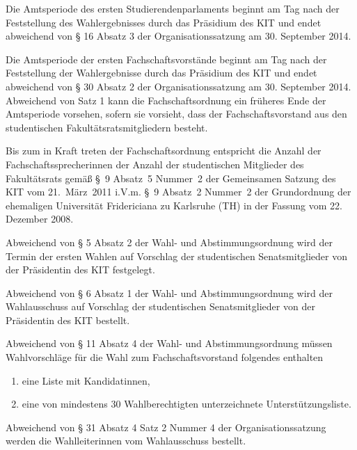 \begin{contract}
\setcounter{Paragraph}{0}
\setcounter{juratoclevel}{0}


\label{amtsperiode}

Die Amtsperiode des ersten Studierendenparlaments beginnt am Tag nach der Feststellung des Wahlergebnisses durch das Präsidium des KIT und endet abweichend von § 16 Absatz 3 der Organisationssatzung am 30. September 2014.

Die Amtsperiode der ersten Fachschaftsvorstände beginnt am Tag nach der Feststellung der Wahlergebnisse durch das Präsidium des KIT und endet abweichend von § 30 Absatz 2 der Organisationssatzung am 30. September 2014. Abweichend von Satz 1 kann die Fachschaftsordnung ein früheres Ende der Amtsperiode vorsehen, sofern sie vorsieht, dass der Fachschaftsvorstand aus den studentischen Fakultätsratsmitgliedern besteht.


\label{fachschaftssprecher}

Bis zum in Kraft treten der Fachschaftsordnung entspricht die Anzahl der Fachschaftssprecherinnen der Anzahl der studentischen Mitglieder des Fakultätsrats gemäß §~9 Absatz~5 Nummer~2 der Gemeinsamen Satzung des KIT vom 21.~März~2011 i.V.m. §~9 Absatz~2 Nummer~2 der Grundordnung der ehemaligen Universität Fridericiana zu Karlsruhe (TH) in der Fassung vom 22. Dezember 2008.


\label{wahlen}

Abweichend  von § 5 Absatz 2 der Wahl- und Abstimmungsordnung wird der Termin der ersten Wahlen auf Vorschlag der studentischen Senatsmitglieder von der Präsidentin des KIT festgelegt.

Abweichend von § 6 Absatz 1 der Wahl- und Abstimmungsordnung wird der Wahlausschuss auf Vorschlag der studentischen Senatsmitglieder von der Präsidentin des KIT bestellt.

Abweichend von § 11 Absatz 4 der Wahl- und Abstimmungsordnung müssen Wahlvorschläge für die Wahl zum Fachschaftsvorstand folgendes enthalten
\begin{enumerate}
\item eine Liste mit Kandidatinnen,
\item eine von mindestens 30 Wahlberechtigten unterzeichnete Unterstützungsliste.
\end{enumerate}

Abweichend von § 31 Absatz 4 Satz 2 Nummer 4 der Organisationssatzung werden die Wahlleiterinnen vom Wahlausschuss bestellt.


\end{contract}
